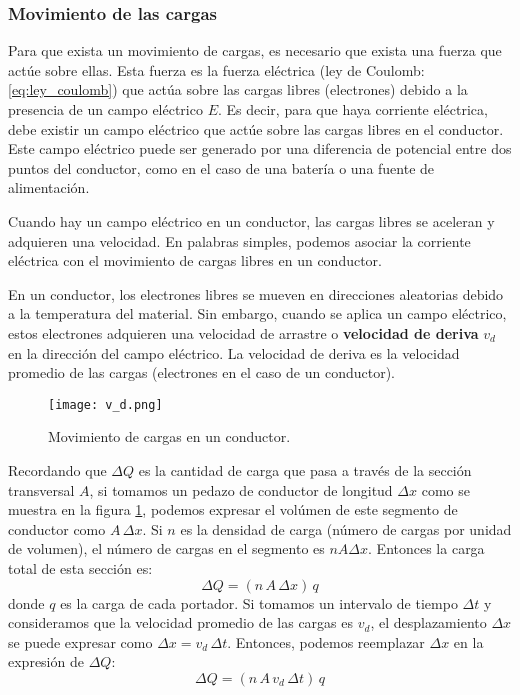 \subsubsection{Movimiento de las cargas}
\label{sec:movimiento_de_cargas}

Para que exista un movimiento de cargas, es necesario que exista una fuerza que actúe sobre ellas. Esta fuerza es la fuerza eléctrica (ley de Coulomb: \ref{eq:ley_coulomb}) que actúa sobre las cargas libres (electrones) debido a la presencia de un campo eléctrico \(E\). Es decir, para que haya corriente eléctrica, debe existir un campo eléctrico que actúe sobre las cargas libres en el conductor. Este campo eléctrico puede ser generado por una diferencia de potencial entre dos puntos del conductor, como en el caso de una batería o una fuente de alimentación.

Cuando hay un campo eléctrico en un conductor, las cargas libres se aceleran y adquieren una velocidad. En palabras simples, podemos asociar la corriente eléctrica con el movimiento de cargas libres en un conductor.

En un conductor, los electrones libres se mueven en direcciones aleatorias debido a la temperatura del material. Sin embargo, cuando se aplica un campo eléctrico, estos electrones adquieren una velocidad de arrastre o \textbf{velocidad de deriva} \(v_d\) en la dirección del campo eléctrico. La velocidad de deriva es la velocidad promedio de las cargas (electrones en el caso de un conductor).

\begin{figure}[ht]
    \centering
    \texttt{[image: v\_d.png]}
    \caption{Movimiento de cargas en un conductor.}
    \label{fig:movimiento_de_cargas_en_un_conductor}
\end{figure}

Recordando que \(\Delta Q\) es la cantidad de carga que pasa a través de la sección transversal \(A\), si tomamos un pedazo de conductor de longitud \(\Delta x\) como se muestra en la figura \ref{fig:movimiento_de_cargas_en_un_conductor}, podemos expresar el volúmen de este segmento de conductor como \(A \, \Delta x\). Si \(n\) es la densidad de carga (número de cargas por unidad de volumen), el número de cargas en el segmento es \(n A \Delta x\). Entonces la carga total de esta sección es:
\[
    \Delta Q = (n \, A \, \Delta x) \, q
\]
donde \(q\) es la carga de cada portador. Si tomamos un intervalo de tiempo \(\Delta t\) y consideramos que la velocidad promedio de las cargas es \(v_d\), el desplazamiento \(\Delta x\) se puede expresar como \(\Delta x = v_d \, \Delta t\). Entonces, podemos reemplazar \(\Delta x\) en la expresión de \(\Delta Q\):
\[
    \Delta Q = (n \, A \, v_d \, \Delta t) \, q
\]


